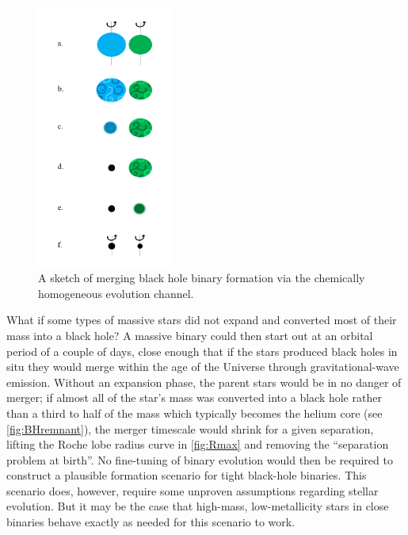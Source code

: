 \documentclass[iop,onecolumn]{revtex4}
\begin{document}
\begin{figure}
	\centering
	\includegraphics[width=0.4\textwidth]{channel2.png}
	\caption{\label{fig:chem_homog} A sketch of merging black hole binary formation via the chemically homogeneous evolution channel.}
\end{figure}

What if some types of massive stars did not expand and converted most of their mass into a black hole? A massive binary could then start out at an orbital period of a couple of days, close enough that if the stars produced black holes in situ they would merge within the age of the Universe through gravitational-wave emission. Without an expansion phase, the parent stars would be in no danger of merger; if almost all of the star's mass was converted into a black hole rather than a third to half of the mass which typically becomes the helium core (see \autoref{fig:BHremnant}), the merger timescale would shrink for a given separation, lifting the Roche lobe radius curve in \autoref{fig:Rmax} and removing the ``separation problem at birth''.  No fine-tuning of binary evolution would then be required to construct a plausible formation scenario for tight black-hole binaries.  This scenario does, however, require some unproven assumptions regarding stellar evolution. But it may be the case that high-mass, low-metallicity stars in close binaries behave exactly as needed for this scenario to work.
\end{document}
